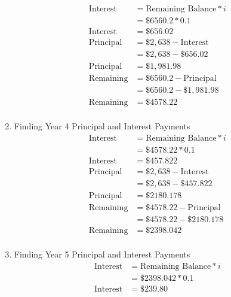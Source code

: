\documentclass{report} %
\begin{document}
\begin{enumerate}
\begin{equation*}
\begin{aligned}
            \text{Interest} &= \text{Remaining Balance} * i \\
                            &= \$6560.2 * 0.1 \\
            \text{Interest} &= \$656.02 \\
            \text{Principal} &= \$2,638 - \text{Interest} \\
                             &= \$2,638 - \$656.02 \\
            \text{Principal} &= \$1,981.98 \\
            \text{Remaining} &= \$6560.2 - \text{Principal} \\
                             &= \$6560.2 - \$1,981.98 \\
            \text{Remaining} &= \$4578.22 \\
        \end{aligned}
    \end{equation*} 
    \item Finding Year 4 Principal and Interest Payments
    \begin{equation*}
        \begin{aligned}
            \text{Interest} &= \text{Remaining Balance} * i \\
                            &= \$4578.22 * 0.1 \\
            \text{Interest} &= \$457.822 \\
            \text{Principal} &= \$2,638 - \text{Interest} \\
                             &= \$2,638 - \$457.822 \\
            \text{Principal} &= \$2180.178 \\
            \text{Remaining} &= \$4578.22 - \text{Principal} \\
                             &= \$4578.22 - \$2180.178 \\
            \text{Remaining} &= \$2398.042 \\
        \end{aligned}
    \end{equation*} 
    \item Finding Year 5 Principal and Interest Payments
    \begin{equation*}
        \begin{aligned}
            \text{Interest} &= \text{Remaining Balance} * i \\
                            &= \$2398.042 * 0.1 \\
            \text{Interest} &= \$239.80 \\

\end{aligned}
\end{equation*}
\end{enumerate}
\end{document}
